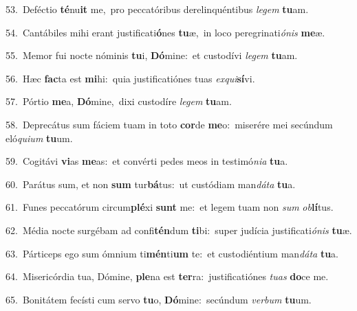 {\numbfont\textcolor{\numbcolor}{53.}}~Deféctio \textbf{té}\-nu\textbf{it} me,~\star pro peccatóribus derelinquéntibus \textit{le}\-\textit{gem} \textbf{tu}\-am.\par
{\numbfont\textcolor{\numbcolor}{54.}}~Cantábiles mihi erant justificati\-\textbf{ó}\-nes \textbf{tu}\-æ,~\star in loco peregrinati\-\textit{ó}\-\textit{nis} \textbf{me}\-æ.\par
{\numbfont\textcolor{\numbcolor}{55.}}~Memor fui nocte nóminis \textbf{tu}\-i, \textbf{Dó}\-mine:~\star et custodívi \textit{le}\-\textit{gem} \textbf{tu}\-am.\par
{\numbfont\textcolor{\numbcolor}{56.}}~Hæc \textbf{fac}\-ta est \textbf{mi}\-hi:~\star quia justificatiónes tuas \textit{ex}\-\textit{qui}\textbf{sí}vi.\par
{\numbfont\textcolor{\numbcolor}{57.}}~Pórtio \textbf{me}\-a, \textbf{Dó}\-mine,~\star dixi custodíre \textit{le}\-\textit{gem} \textbf{tu}\-am.\par
{\numbfont\textcolor{\numbcolor}{58.}}~Deprecátus sum fáciem tuam in toto \textbf{cor}\-de \textbf{me}\-o:~\star miserére mei secúndum eló\-\textit{qui}\-\textit{um} \textbf{tu}\-um.\par
{\numbfont\textcolor{\numbcolor}{59.}}~Cogitávi \textbf{vi}\-as \textbf{me}\-as:~\star et convérti pedes meos in testimó\-\textit{ni}\-\textit{a} \textbf{tu}\-a.\par
{\numbfont\textcolor{\numbcolor}{60.}}~Parátus sum, et non \textbf{sum} tur\-\textbf{bá}\-tus:~\star ut custódiam man\-\textit{dá}\-\textit{ta} \textbf{tu}\-a.\par
{\numbfont\textcolor{\numbcolor}{61.}}~Funes peccatórum circum\-\textbf{plé}\-xi \textbf{sunt} me:~\star et legem tuam non \textit{sum} \textit{ob}\-\textbf{lí}tus.\par
{\numbfont\textcolor{\numbcolor}{62.}}~Média nocte surgébam ad confi\-\textbf{tén}\-dum \textbf{ti}\-bi:~\star super judícia justificati\-\textit{ó}\-\textit{nis} \textbf{tu}\-æ.\par
{\numbfont\textcolor{\numbcolor}{63.}}~Párticeps ego sum ómnium ti\-\textbf{mén}\-ti\textbf{um} te:~\star et custodiéntium man\-\textit{dá}\-\textit{ta} \textbf{tu}\-a.\par
{\numbfont\textcolor{\numbcolor}{64.}}~Misericórdia tua, Dómine, \textbf{ple}\-na est \textbf{ter}\-ra:~\star justificatiónes \textit{tu}\-\textit{as} \textbf{do}\-ce me.\par
{\numbfont\textcolor{\numbcolor}{65.}}~Bonitátem fecísti cum servo \textbf{tu}\-o, \textbf{Dó}\-mine:~\star secúndum \textit{ver}\-\textit{bum} \textbf{tu}\-um.\par
